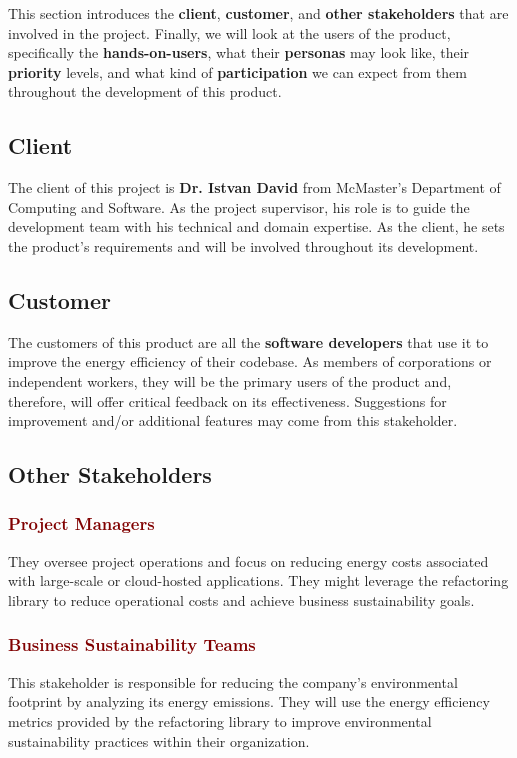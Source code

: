 \documentclass[12pt]{article}
\begin{document}
This section introduces the \textbf{client}, \textbf{customer}, and \textbf{other stakeholders} that are involved in the project. Finally, we will look at the users of the product, specifically the \textbf{hands-on-users}, what their \textbf{personas} may look like, their \textbf{priority} levels, and what kind of \textbf{participation} we can expect from them throughout the development of this product.
\subsection{Client}
The client of this project is \textbf{Dr. Istvan David} from McMaster's Department of Computing and Software. As the project supervisor, his role is to guide the development team with his technical and domain expertise. As the client, he sets the product's requirements and will be involved throughout its development. 
\subsection{Customer}
The customers of this product are all the \textbf{software developers} that use it to improve the energy efficiency of their codebase. As members of corporations or independent workers, they will be the primary users of the product and, therefore, will offer critical feedback on its effectiveness. Suggestions for improvement and/or additional features may come from this stakeholder. 

\subsection{Other Stakeholders}
\subsubsection*{\textcolor{Maroon}{Project Managers}}
They oversee project operations and focus on reducing energy costs associated with large-scale or cloud-hosted applications. They might leverage the refactoring library to reduce operational costs and achieve business sustainability goals.

\subsubsection*{\textcolor{Maroon}{Business Sustainability Teams}}
This stakeholder is responsible for reducing the company's environmental footprint by analyzing its energy emissions. They will use the energy efficiency metrics provided by the refactoring library to improve environmental sustainability practices within their organization.
\end{document}
